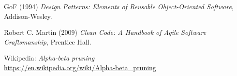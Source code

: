 \newpage
\begin{thebibliography}{30}
     GoF (1994) \emph{Design Patterns: Elements of Reusable Object-Oriented Software},
    Addison-Wesley.

     Robert C. Martin (2009) \emph{Clean Code: A Handbook of Agile Software Craftsmanship},
    Prentice Hall.

     Wikipedia: \emph{Alpha-beta pruning}\\
    \url{https://en.wikipedia.org/wiki/Alpha-beta_pruning}
\end{thebibliography}
